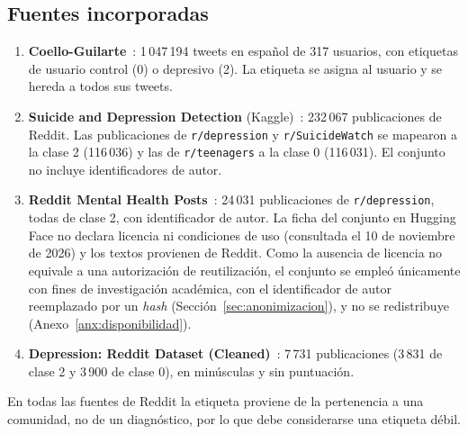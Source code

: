 \documentclass[12pt,a4paper]{article}
\begin{document}
\subsection{Fuentes incorporadas}
\label{sec:fuentes}
\begin{enumerate}[leftmargin=2em]
    \item \textbf{Coello-Guilarte}~\cite{coello2019}: 1\,047\,194 tweets en español de 317 usuarios, con etiquetas de usuario control (0) o depresivo (2). La etiqueta se asigna al usuario y se hereda a todos sus tweets.
    \item \textbf{Suicide and Depression Detection} (Kaggle)~\cite{komati2021sdd}: 232\,067 publicaciones de Reddit. Las publicaciones de \texttt{r/depression} y \texttt{r/SuicideWatch} se mapearon a la clase 2 (116\,036) y las de \texttt{r/teenagers} a la clase 0 (116\,031). El conjunto no incluye identificadores de autor.
    \item \textbf{Reddit Mental Health Posts}~\cite{solomonk_rmhp}: 24\,031 publicaciones de \texttt{r/depression}, todas de clase 2, con identificador de autor. La ficha del conjunto en Hugging Face no declara licencia ni condiciones de uso (consultada el 10 de noviembre de 2026) y los textos provienen de Reddit. Como la ausencia de licencia no equivale a una autorización de reutilización, el conjunto se empleó únicamente con fines de investigación académica, con el identificador de autor reemplazado por un \emph{hash} (Sección~\ref{sec:anonimizacion}), y no se redistribuye (Anexo~\ref{anx:disponibilidad}).
    \item \textbf{Depression: Reddit Dataset (Cleaned)}~\cite{mrjunos_drc}: 7\,731 publicaciones (3\,831 de clase 2 y 3\,900 de clase 0), en minúsculas y sin puntuación.
\end{enumerate}
En todas las fuentes de Reddit la etiqueta proviene de la pertenencia a una comunidad, no de un diagnóstico, por lo que debe considerarse una etiqueta débil.
\end{document}
